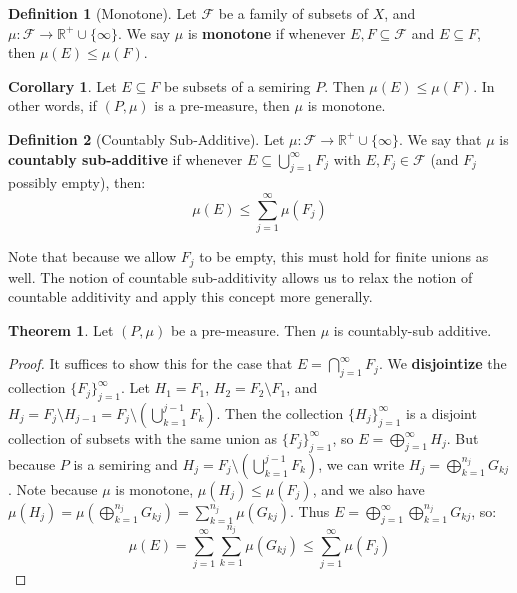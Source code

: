 \documentclass[11pt, oneside]{amsart}   	%
\theoremstyle{definition}
\newtheorem{definition}{Definition}[section]
\newtheorem{theorem}{Theorem}[section]
\newtheorem{corollary}{Corollary}[theorem]
\begin{document}
	\begin{definition}[Monotone]
		Let $\mathcal F$ be a family of subsets of $X$, and $\mu : \mathcal F\rightarrow\mathbb R^+\cup\{\infty\}$. We say 
		$\mu$ is \textbf{monotone} if whenever $E, F\subseteq\mathcal F$ and $E\subseteq F$, then $\mu(E)\leq\mu(F)$. 
	\end{definition}
	
	\begin{corollary}
		Let $E\subseteq F$ be subsets of a semiring $P$. Then $\mu(E)\leq\mu(F)$. In other words, if $(P, \mu)$ is a 
		pre-measure, then $\mu$ is monotone.
	\end{corollary}
	
	\begin{definition}[Countably Sub-Additive]
		Let $\mu : \mathcal F\rightarrow\mathbb R^+\cup\{\infty\}$. We say that $\mu$ is \textbf{countably sub-additive} if 
		whenever $E\subseteq\bigcup_{j = 1}^\infty F_j$ with $E, F_j\in\mathcal F$ (and $F_j$ possibly empty), then:
		$$
			\mu(E)\leq\sum_{j = 1}^\infty\mu(F_j)
		$$
	\end{definition}
	
	Note that because we allow $F_j$ to be empty, this must hold for finite unions as well. The notion of countable 
	sub-additivity allows us to relax the notion of countable additivity and apply this concept more generally. 
	
	\begin{theorem}
		Let $(P, \mu)$ be a pre-measure. Then $\mu$ is countably-sub additive. 
	\end{theorem}
	
	\begin{proof}
		It suffices to show this for the case that $E = \bigcap_{j = 1}^\infty F_j$. We \textbf{disjointize} the collection 
		$\{F_j\}_{j = 1}^\infty$. Let $H_1 = F_1$, $H_2 = F_2\setminus F_1$, and $H_j = F_j\setminus H_{j - 1} = F_j
		\setminus(\bigcup_{k = 1}^{j - 1} F_k)$. Then the collection $\{H_j\}_{j = 1}^\infty$ is a disjoint collection of subsets 
		with the same union as $\{F_j\}_{j = 1}^\infty$, so $E = \bigoplus_{j = 1}^\infty H_j$. But because $P$ is a semiring 
		and $H_j = F_j\setminus(\bigcup_{k = 1}^{j - 1} F_k)$, we can write $H_j = \bigoplus_{k = 1}^{n_j} G_{kj}$. Note 
		because $\mu$ is monotone, $\mu(H_j)\leq \mu(F_j)$, and we also have $\mu(H_j) = \mu(\bigoplus_{k = 1}^{n_j} 
		G_{kj}) = \sum_{k = 1}^{n_j}\mu(G_{kj})$. Thus $E = \bigoplus_{j = 1}^\infty\bigoplus_{k = 1}^{n_j} G_{kj}$, so:
		$$
			\mu(E) = \sum_{j = 1}^\infty\sum_{k = 1}^{n_j}\mu(G_{kj})\leq\sum_{j = 1}^\infty\mu(F_j)
		$$
	\end{proof}
	
\end{document}
